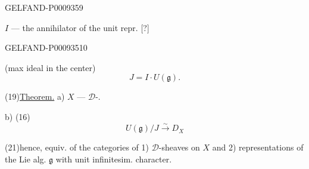 \begin{GelfandAdjacentEvidence}{GELFAND-P000935}{9}


$I$ --- the annihilator of the unit repr. [?]
\end{GelfandAdjacentEvidence}
\begin{GelfandAdjacentEvidence}{GELFAND-P000935}{10}


(max ideal in the center)
\begin{equation*}
 J=I\cdot U(\mathfrak g).
 \tag{18}
\end{equation*}

(19)\quad \underline{Theorem.} a) $X$ --- $\mathcal D$-.

b)\enspace {} (16) 
\begin{equation*}
 U(\mathfrak g)/J\overset{\sim}{\longrightarrow}D_X
 \tag{20}
\end{equation*}
\end{GelfandAdjacentEvidence}


(21)\quad hence, equiv. of the categories of 1) $\mathcal D$-sheaves on $X$ and 2) representations of the Lie alg. $\mathfrak g$ with unit infinitesim. character.

